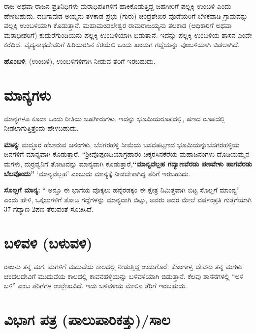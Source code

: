 ರಾಜ ಅಥವಾ ರಾಜನ ಪ್ರತಿನಿಧಿಗಳು ಮಠಾಧಿಪತಿಗಳಿಗೆ ಹಾಕಿಕೊಡುತ್ತಿದ್ದ ಜಹಗೀರಿಗೆ ಪಲ್ಲಕ್ಕಿ ಉಂಬಳಿ ಎಂದು ಹೇಳಬಹುದು. ದಬಗಾವುಡ ಅಯ್ಯನು ತಳಕಾಡ ಪ್ರಭು (ಗುರು) ಚಂದ್ರಶೇಖರ ವೊಡೆಯರಿಗೆ ಬೆಳಕವಾಡಿ ಗ್ರಾಮವನ್ನು ಪಲ್ಲಕ್ಕಿ ಉಂಬಳಿಯಾಗಿ ಕೊಡುತ್ತಾನೆ. ಮಹಾಮಂಡಲೇಶ್ವರ ರಾಮರಾಜಯ್ಯನು ತಲಕಾಡ (ಅಧಿಕಾರಿಗೆ ಅಥವಾ ಮಠಾಧೀಶರಿಗೆ) ಕುದುರೆಗುಂಡಿಯನು ಪಲ್ಲಕ್ಕಿ ಉಂಬಳಿಯಾಗಿ ಬಿಡುತ್ತಾನೆ. ಇದನ್ನು ಪಲ್ಲಕ್ಕಿ ಉಂಬಳಿಯ ಶಾಸನ ಎಂದೇ ಕರೆದಿದೆ. ವೈದ್ಯನಾಥದೇವರಿಗೆ ಹಿರಿಯರಸಿನ ಕೆರಯೆಲಿ ಒಂದು ಖಂಡುಗ ಗದ್ದೆಯನ್ನು ವುಂಬಳಿಯಾಗಿ ಬಿಡಲಾಗಿದೆ.

\textbf{ಹೊಂಬಳಿ}: (ಉಂಬಳಿ), ಉಂಬಳಿಗಳಿಗಾಗಿ ನೀಡುವ ತೆರಿಗೆ ಇರಬಹುದು.

\section*{ಮಾನ್ಯಗಳು}

ಮಾನ್ಯಗಳೂ ಕೂಡಾ ಒಂದು ರೀತಿಯ ಜಹಗೀರುಗಳು. ಇದನ್ನು ಭೂಮಿಯರೂಪದಲ್ಲಿ, ಹಣದ ರೂಪದಲ್ಲಿ ನೀಡಲಾಗುತ್ತಿತ್ತೆಂದು ಹೇಳಬಹುದು.

\textbf{ಮಾನ್ಯ}: ಮದ್ದೂರ ಹೆಬಾರುವ ಜನಂಗಳು, ಬೆಸಗರಹಳ್ಳಿ ಸೀಮೆಯ ಬಸವಪಟ್ಟಣದ ಭೂಮಿಯನ್ನು\break ಬೆಸಗರಹಳ್ಳಿಯ ಜನಗಳಿಗೆ ಮಾನ್ಯವಾಗಿ ಕೊಡುತ್ತಾರೆ. “ಶ‍್ರೀವೊಪ್ಪಣದಿಯಾಗ್ರಹಾರಂ ಚಿಕ್ಕರಸಿನಕೆರೆಯ ಮಹಾಜನಂಗಳು ದೊಡಿಯಮ್ಮನ ಮಗಳು, ಮರ್ರವ್ವನಿಗೆ ತೋಟವನ್ನು ಮಾನ್ಯವಾಗಿ ಕೊಡುತ್ತಾರೆ,\textbf{“ಮಾನ್ಯವೆಲ್ಲಹ ಗದ್ಯಾಣವೆರಡು ಪಣವೇಳು ಹಾಗವೆರಡು ಬೆಲವೊಂದು”} `ಮಾನ್ಯವೆಲ್ಲಹ' ಎಂಬುದು ಮಾನ್ಯಕ್ಕೆ ನೀಡಬೇಕಾಗಿದ್ದ ತೆರಿಗೆ ಇರಬಹುದು.

\textbf{ಸೊಲ್ಲಗೆ ಮಾನ್ಯ:} “ ಅನ್ತೂ ಈ ಭಾಗೆಯ ವೊಕ್ಕಲು ಹನ್ನೆರಡಕ್ಕಂ ಈ ಕ್ಷೇತ್ರ ನಿಮಿತ್ತವಾಗಿ ಬಿಟ್ಟ ಸೊಲ್ಲಗೆ ಮಾಂನ್ಯ” ಎಂದು ಹೇಳಿ, ಒಕ್ಕಲುಗಳಿಗೆ ತೋಟ ಗದ್ದೆಗಳನ್ನು ಮಾನ್ಯವಾಗಿ ಬಿಟ್ಟು, ಅವರು ಅದರ ಮೇಲೆ ವರ್ಷಂಪ್ರತಿ ಗುತ್ತಗೆಯಾಗಿ 37 ಗದ್ಯಾಣ 2ಪಣ ತೆರುವಂತೆ ಸೂಚಿಸಿದೆ.

\section*{ಬಳಿವಳಿ (ಬಳುವಳಿ)}

ರಾಜನು ತನ್ನ ಮಗ, ಮಗಳಿಗೆ ಮದುವೆಯ ಕಾಲದಲ್ಲಿ ನೀಡುತ್ತಿದ್ದ ಉಡುಗೊರೆ. ಕೊಂಗಾಳ್ವ ದೇವನು ತನ್ನ ಮಗಳು ಚಂದಲದೇವಿಗೆ ಮುದುವೆಯ ಕಾಲದಲ್ಲಿ ಕಾವನಹಳ್ಳಿಯನ್ನು ಬಳಿವಳಿಯಾಗಿ ಬಿಡುತ್ತಾನೆ. ಕೆಲವು ಶಾಸನಗಳಲ್ಲಿ “ಅಳಿ ಬಳಿ” ಎಂಬ ತೆರಿಗೆಗಳ ಉಲ್ಲೇಖವಿದೆ. ಇದು ಬಳಿವಳಿಯ ಮೇಲಿನ ತೆರಿಗೆ ಇರಬಹುದು.

\section*{ವಿಭಾಗ ಪತ್ರ (ಪಾಲುಪಾರಿಕತ್ತು)/ಸಾಲ}

